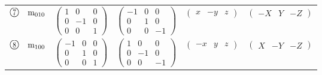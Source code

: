 \documentclass[fleqn,10pt,landscape]{jsarticle}
\begin{document}
\begin{center}
\begin{longtable}{lcccc}
$ {\ooalign{\hfil\resizebox{.8\width}{\height}{7}\hfil\crcr\raise.1ex\hbox{\large$\bigcirc$}}}\quad {\rm m}_{010} $ & $ \begin{pmatrix} 1 & 0 & 0 \\ 0 & -1 & 0 \\ 0 & 0 & 1 \end{pmatrix} $ & $ \begin{pmatrix} -1 & 0 & 0 \\ 0 & 1 & 0 \\ 0 & 0 & -1 \end{pmatrix} $ & $ \begin{pmatrix} x & - y & z \end{pmatrix} $ & $ \begin{pmatrix} - X & Y & - Z \end{pmatrix} $ \\
$ {\ooalign{\hfil\resizebox{.8\width}{\height}{8}\hfil\crcr\raise.1ex\hbox{\large$\bigcirc$}}}\quad {\rm m}_{100} $ & $ \begin{pmatrix} -1 & 0 & 0 \\ 0 & 1 & 0 \\ 0 & 0 & 1 \end{pmatrix} $ & $ \begin{pmatrix} 1 & 0 & 0 \\ 0 & -1 & 0 \\ 0 & 0 & -1 \end{pmatrix} $ & $ \begin{pmatrix} - x & y & z \end{pmatrix} $ & $ \begin{pmatrix} X & - Y & - Z \end{pmatrix} $ \\
\end{longtable}
\end{center}
\newpage
\end{document}
